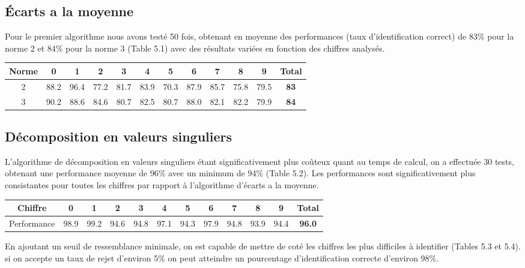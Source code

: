 \documentclass[a4paper,11pt,twoside]{report}
\begin{document}
\subsection{Écarts a la moyenne}
Pour le premier algorithme nous avons testé 50 fois, obtenant en moyenne des performances (taux d'identification correct) de 83\% pour la norme 2 et 84\% pour la norme 3 (Table 5.1) avec des résultats variées en fonction des chiffres analysés.

\begin{center}
\begin{tabular}{ |c||c|c|c|c|c|c|c|c|c|c|c| } 
\hline
 Norme & 0 & 1 & 2 & 3 & 4 & 5 & 6 & 7 & 8 & 9 & \textbf{Total} \\ 
  \hline
  \hline
  2 & 88.2 & 96.4 & 77.2 & 81.7 & 83.9 & 70.3 & 87.9 & 85.7 & 75.8 & 79.5 & \textbf{83} \\
 \hline
  3 & 90.2 & 88.6 & 84.6 & 80.7 & 82.5 & 80.7 & 88.0 & 82.1 & 82.2 & 79.9 & \textbf{84} \\
 \hline
\end{tabular}
\end{center}

\subsection{Décomposition en valeurs singuliers}
L'algorithme de décomposition en valeurs singuliers étant significativement plus coûteux quant au temps de calcul, on a effectuée 30 tests, obtenant une performance moyenne de 96\% avec un minimum de 94\% (Table 5.2). Les performances sont significativement plus consistantes pour toutes les chiffres par rapport à l'algorithme d'écarts a la moyenne.

\begin{center}
\begin{tabular}{ |c||c|c|c|c|c|c|c|c|c|c|c| } 
\hline
 Chiffre & 0 & 1 & 2 & 3 & 4 & 5 & 6 & 7 & 8 & 9 & \textbf{Total} \\ 
  \hline
  \hline
  Performance & 98.9 & 99.2 & 94.6 & 94.8 & 97.1 & 94.3 & 97.9 & 94.8 & 93.9 & 94.4 & \textbf{96.0} \\ 
\hline
\end{tabular}
\end{center}

En ajoutant un seuil de ressemblance minimale, on est capable de mettre de coté les chiffres les plus difficiles à identifier (Tables 5.3 et 5.4). si on accepte un taux de rejet d'environ 5\% on peut atteindre un pourcentage d'identification correcte d'environ 98\%.
\end{document}
